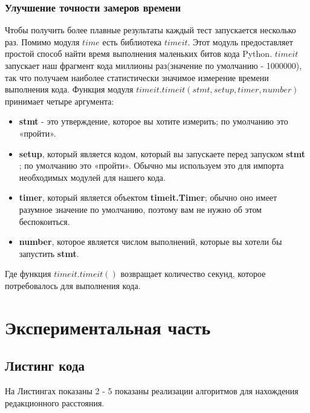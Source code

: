 \documentclass[a4paper]{article}
\begin{document}
	\subsubsection{Улучшение точности замеров времени} Чтобы получить более плавные результаты каждый тест запускается несколько раз.
	Помимо модуля $time$ есть библиотека $timeit$. Этот модуль предоставляет простой способ найти время выполнения маленьких битов кода Python.
	$timeit$ запускает наш фрагмент кода миллионы раз(значение по умолчанию - 1000000), так что получаем наиболее статистически значимое измерение времени выполнения кода.
	Функция модуля $timeit.timeit (stmt, setup, timer, number)$ принимает четыре аргумента:
	\begin{itemize}
		\item {\bf stmt} - это утверждение, которое вы хотите измерить; по умолчанию это «пройти».
		\item {\bf setup}, который является кодом, который вы запускаете перед запуском {\bf stmt} ; по умолчанию это «пройти». Обычно мы используем это для импорта необходимых модулей для нашего кода.
		\item {\bf timer}, который является объектом {\bf timeit.Timer}; обычно оно имеет разумное значение по умолчанию, поэтому вам не нужно об этом беспокоиться.
		\item {\bf number}, которое является числом выполнений, которые вы хотели бы запустить {\bf stmt}.
	\end{itemize}
	Где функция $timeit.timeit () $ возвращает количество секунд, которое потребовалось для выполнения кода.
	
	
	\section{Экспериментальная часть}
	
	\subsection{Листинг кода}
	На Листингах показаны 2 - 5 показаны реализации алгоритмов для нахождения редакционного расстояния.
	
\end{document}
